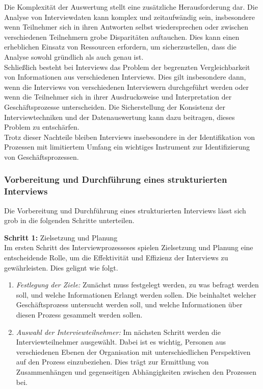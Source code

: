 Die Komplexität der Auswertung stellt eine zusätzliche Herausforderung dar. Die Analyse von Interviewdaten kann komplex und zeitaufwändig sein, insbesondere wenn Teilnehmer sich in ihren Antworten selbst wiedersprechen oder zwischen verschiedenen Teilnehmern grobe Disparitäten auftauchen. Dies kann einen erheblichen Einsatz von Ressourcen erfordern, um sicherzustellen, dass die Analyse sowohl gründlich als auch genau ist.\\

Schließlich besteht bei Interviews das Problem der begrenzten Vergleichbarkeit von Informationen aus verschiedenen Interviews. Dies gilt insbesondere dann, wenn die Interviews von verschiedenen Interviewern durchgeführt werden oder wenn die Teilnehmer sich in ihrer Ausdrucksweise und Interpretation der Geschäftsprozesse unterscheiden. Die Sicherstellung der Konsistenz der Interviewtechniken und der Datenauswertung kann dazu beitragen, dieses Problem zu entschärfen.\\

Trotz dieser Nachteile bleiben Interviews insebesondere in der Identifikation von Prozessen mit limitiertem Umfang ein wichtiges Instrument zur Identifizierung von Geschäftsprozessen.

\subsubsection{Vorbereitung und Durchführung eines strukturierten Interviews}

Die Vorbereitung und Durchführung eines strukturierten Interviews lässt sich grob in die folgenden Schritte unterteilen.~\cite{Seidman2006, Kvale2009}

\textbf{Schritt 1:} Zielsetzung und Planung\\
Im ersten Schritt des Interviewprozesseses spielen Zielsetzung und Planung eine entscheidende Rolle, um die Effektivität und Effizienz der Interviews zu gewährleisten. Dies gelignt wie folgt.
\begin{enumerate}
    \item \textit{Festlegung der Ziele:} Zunächst muss festgelegt werden, zu was befragt werden soll, und welche Informationen Erlangt werden sollen. Die beinhaltet welcher Geschäftsprozess untersucht werden soll, und welche Informationen über diesen Prozess gesammelt werden sollen.
    \item \textit{Auswahl der Interviewteilnehmer:} Im nächsten Schritt werden die Interviewteilnehmer ausgewählt. Dabei ist es wichtig, Personen aus verschiedenen Ebenen der Organisation mit unterschiedlichen Perspektiven auf den Prozess einzubeziehen. Dies trägt zur Ermittlung von Zusammenhängen und gegenseitigen Abhängigkeiten zwischen den Prozessen bei.
\end{enumerate}

